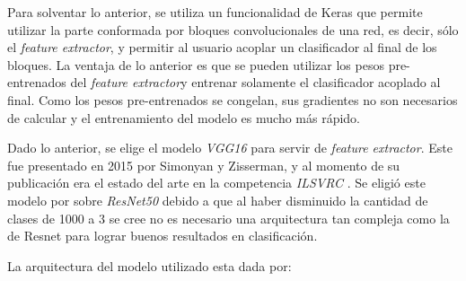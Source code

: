 \documentclass[conference]{IEEEtran}
\begin{document}
Para solventar lo anterior, se utiliza un funcionalidad de Keras que permite utilizar la parte conformada por bloques convolucionales de una red, es decir, sólo el \textit{feature extractor}, y permitir al usuario acoplar un clasificador al final de los bloques. La ventaja de lo anterior es que se pueden utilizar los pesos pre-entrenados del \textit{feature extractor}y entrenar solamente el clasificador acoplado al final. Como los pesos pre-entrenados se congelan, sus gradientes no son necesarios de calcular y el entrenamiento del modelo es mucho más rápido.

Dado lo anterior, se elige el modelo \textit{VGG16} para servir de \textit{feature extractor}. Este fue presentado en 2015 por Simonyan y Zisserman, y al momento de su publicación era el estado del arte en la competencia \textit{ILSVRC} \cite{vgg16}. Se eligió este modelo por sobre \textit{ResNet50} debido a que al haber disminuido la cantidad de clases de 1000 a 3 se cree no es necesario una arquitectura tan compleja como la de Resnet para lograr buenos resultados en clasificación.

La arquitectura del modelo utilizado esta dada por:
\end{document}
